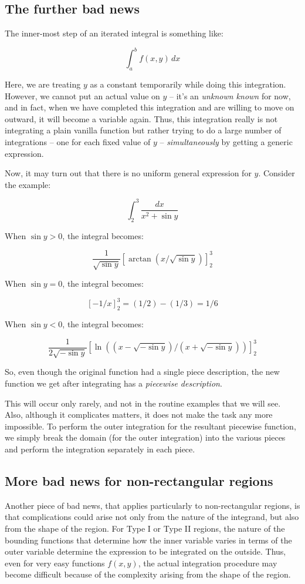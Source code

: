 \documentclass[10pt]{amsart}
\begin{document}
\subsection{The further bad news}

The inner-most step of an iterated integral is something like:

$$\int_a^b f(x,y) \, dx$$

Here, we are treating $y$ as a constant temporarily while doing this
integration. However, we cannot put an actual value on $y$ -- it's an
{\em unknown known} for now, and in fact, when we have completed this
integration and are willing to move on outward, it will become a
variable again. Thus, this integration really is not integrating a
plain vanilla function but rather trying to do a large number of
integrations -- one for each fixed value of $y$ -- {\em
simultaneously} by getting a generic expression.

Now, it may turn out that there is no uniform general expression for
$y$. Consider the example:

$$\int_2^3 \frac{dx}{x^2 + \sin y}$$

When $\sin y > 0$, the integral becomes:

$$\frac{1}{\sqrt{\sin y}} \left[\arctan(x/\sqrt{\sin y})\right]_2^3$$

When $\sin y = 0$, the integral becomes:

$$[-1/x]_2^3 = (1/2) - (1/3) = 1/6$$

When $\sin y < 0$, the integral becomes:

$$\frac{1}{2\sqrt{-\sin y}}\left[\ln((x - \sqrt{-\sin y})/(x + \sqrt{-\sin y}))\right]_2^3$$

So, even though the original function had a single piece description,
the new function we get after integrating has a {\em piecewise
description}.

This will occur only rarely, and not in the routine examples that we
will see. Also, although it complicates matters, it does not make the
task any more impossible. To perform the outer integration for the
resultant piecewise function, we simply break the domain (for the
outer integration) into the various pieces and perform the integration
separately in each piece.

\subsection{More bad news for non-rectangular regions}

Another piece of bad news, that applies particularly to
non-rectangular regions, is that complications could arise not only
from the nature of the integrand, but also from the shape of the
region. For Type I or Type II regions, the nature of the bounding
functions that determine how the inner variable varies in terms of the
outer variable determine the expression to be integrated on the
outside. Thus, even for very easy functions $f(x,y)$, the actual
integration procedure may become difficult because of the complexity
arising from the shape of the region.
\end{document}
